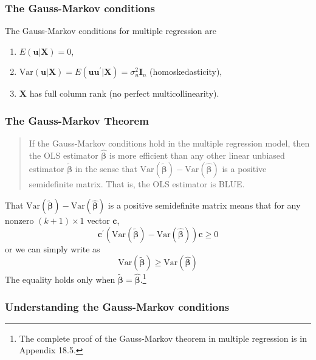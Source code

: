 \documentclass[a4paper,11pt]{article}
\newcommand{\var}{\mathrm{Var}}
\begin{document}
\subsubsection*{The Gauss-Markov conditions}
\label{sec:org42d4d2a}

The Gauss-Markov conditions for multiple regression are
\begin{enumerate}
\item \(E(\mathbf{u} | \mathbf{X}) = 0\),
\item \(\var(\mathbf{u} | \mathbf{X}) = E(\mathbf{uu}^{\prime} |
   \mathbf{X}) = \sigma^2_u \mathbf{I}_n\) (homoskedasticity),
\item \(\mathbf{X}\) has full column rank (no perfect multicollinearity).
\end{enumerate}

\subsubsection*{The Gauss-Markov Theorem}
\label{sec:org773ec05}

\begin{quote}
If the Gauss-Markov conditions hold in the multiple regression model,
then the OLS estimator \(\hat{\boldsymbol{\beta}}\) is more efficient
than any other linear unbiased estimator \(\tilde{\boldsymbol{\beta}}\)
in the sense that \(\var(\tilde{\boldsymbol{\beta}}) -
\var(\hat{\boldsymbol{\beta}})\) is a positive semidefinite
matrix. That is, the OLS estimator is BLUE.
\end{quote}

That \(\var(\tilde{\boldsymbol{\beta}}) -
\var(\hat{\boldsymbol{\beta}})\) is a positive semidefinite matrix
means that for any nonzero \((k+1) \times 1\) vector \(\mathbf{c}\),
\[ \mathbf{c}^{\prime}\left(\var(\tilde{\boldsymbol{\beta}}) -
\var(\hat{\boldsymbol{\beta}})\right) \mathbf{c} \geq 0 \]
or we can simply write as
\[ \var(\tilde{\boldsymbol{\beta}}) \geq
\var(\hat{\boldsymbol{\beta}})  \]
The equality holds only when \(\tilde{\boldsymbol{\beta}} =
\hat{\boldsymbol{\beta}}\).\footnote{The complete proof of the Gauss-Markov
theorem in multiple regression is in Appendix 18.5.}

\subsubsection*{Understanding the Gauss-Markov conditions}
\label{sec:org45f5c15}
\end{document}
